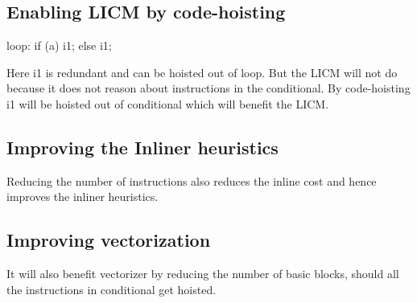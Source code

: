 \begin{section}
\section{Enabling LICM by code-hoisting}
loop:
if (a)
  i1;
else
  i1;

Here i1 is redundant and can be hoisted out of loop. But the LICM will not do because it does not reason about instructions in the conditional.
By code-hoisting i1 will be hoisted out of conditional which will benefit the LICM.

\section{Improving the Inliner heuristics}
Reducing the number of instructions also reduces the inline cost and hence improves the inliner heuristics.

\section{Improving vectorization}
It will also benefit vectorizer by reducing the number
of basic blocks, should all the instructions in conditional get hoisted.

\end{section}


